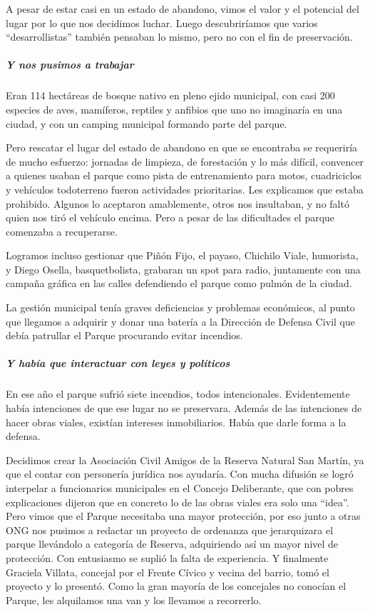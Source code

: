 \documentclass[
]{article}
\begin{document}
A pesar de estar casi en un estado de abandono, vimos el valor y el
potencial del lugar por lo que nos decidimos luchar. Luego
descubriríamos que varios ``desarrollistas'' también pensaban lo mismo,
pero no con el fin de preservación.

\hypertarget{y-nos-pusimos-a-trabajar}{%
\subparagraph{Y nos pusimos a trabajar}\label{y-nos-pusimos-a-trabajar}}

Eran 114 hectáreas de bosque nativo en pleno ejido municipal, con casi
200 especies de aves, mamíferos, reptiles y anfibios que uno no
imaginaría en una ciudad, y con un camping municipal formando parte del
parque.

Pero rescatar el lugar del estado de abandono en que se encontraba se
requeriría de mucho esfuerzo: jornadas de limpieza, de forestación y lo
más difícil, convencer a quienes usaban el parque como pista de
entrenamiento para motos, cuadriciclos y vehículos todoterreno fueron
actividades prioritarias. Les explicamos que estaba prohibido. Algunos
lo aceptaron amablemente, otros nos insultaban, y no faltó quien nos
tiró el vehículo encima. Pero a pesar de las dificultades el parque
comenzaba a recuperarse.

Logramos incluso gestionar que Piñón Fijo, el payaso, Chichilo Viale,
humorista, y Diego Osella, basquetbolista, grabaran un spot para radio,
juntamente con una campaña gráfica en las calles defendiendo el parque
como pulmón de la ciudad.

La gestión municipal tenía graves deficiencias y problemas económicos,
al punto que llegamos a adquirir y donar una batería a la Dirección de
Defensa Civil que debía patrullar el Parque procurando evitar incendios.

\hypertarget{y-habuxeda-que-interactuar-con-leyes-y-poluxedticos}{%
\subparagraph{Y había que interactuar con leyes y
políticos}\label{y-habuxeda-que-interactuar-con-leyes-y-poluxedticos}}

En ese año el parque sufrió siete incendios, todos intencionales.
Evidentemente había intenciones de que ese lugar no se preservara.
Además de las intenciones de hacer obras viales, existían intereses
inmobiliarios. Había que darle forma a la defensa.

Decidimos crear la Asociación Civil Amigos de la Reserva Natural San
Martín, ya que el contar con personería jurídica nos ayudaría. Con mucha
difusión se logró interpelar a funcionarios municipales en el Concejo
Deliberante, que con pobres explicaciones dijeron que en concreto lo de
las obras viales era solo una ``idea''. Pero vimos que el Parque
necesitaba una mayor protección, por eso junto a otras ONG nos pusimos a
redactar un proyecto de ordenanza que jerarquizara el parque llevándolo
a categoría de Reserva, adquiriendo así un mayor nivel de protección.
Con entusiasmo se suplió la falta de experiencia. Y finalmente Graciela
Villata, concejal por el Frente Cívico y vecina del barrio, tomó el
proyecto y lo presentó. Como la gran mayoría de los concejales no
conocían el Parque, les alquilamos una van y los llevamos a recorrerlo.
\end{document}
